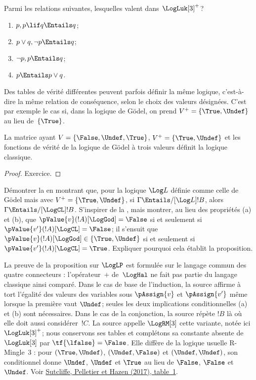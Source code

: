 \documentclass[../../../include/open-logic-section]{subfiles}
\begin{document}
\begin{prob}
  Parmi les relations suivantes,
  lesquelles valent dans~$\LogLuk[3]^{+}$?
  \begin{enumerate}
    \item $p,p\lif q\Entails q$;
    \item $p\lor q,\lnot p\Entails q$;
    \item $\lnot p,p\Entails q$;
    \item $p\Entails p\lor q$.
  \end{enumerate}
\end{prob}

Des tables de vérité différentes
peuvent parfois définir la même
logique, c'est-à-dire la même relation
de conséquence, selon le choix des
valeurs désignées. C'est par exemple
le cas si, dans la logique de G\"odel,
on prend
$V^+=\{\True,\Undef\}$
au lieu de~$\{\True\}$.

\begin{prop}
  La matrice ayant
  $V=\{\False,\Undef,\True\}$,
  $V^+=\{\True,\Undef\}$ et les
  fonctions de vérité de la logique
  de G\"odel à trois valeurs définit
  la logique classique.
\end{prop}

\begin{proof}
  Exercice.
\end{proof}

\begin{prob}
  Démontrer la 
  en montrant que, pour la logique
  $\Log L$ définie comme celle de
  G\"odel mais avec
  $V^+=\{\True,\Undef\}$, si
  $\Gamma\Entails/[\Log L] !B$,
  alors
  $\Gamma\Entails/[\LogCL] !B$.
  S'inspirer de la
  ,
  mais montrer, au lieu des propriétés
  (a) et (b), que
  $\pValue{v}(!A)[\LogGod]=\False$
  si et seulement si
  $\pValue{v'}(!A)[\LogCL]=\False$;
  il s'ensuit que
  $\pValue{v}(!A)[\LogGod]
  \in\{\True,\Undef\}$ si et
  seulement si
  $\pValue{v'}(!A)[\LogCL]=\True$.
  Expliquer pourquoi cela établit
  la proposition.
\end{prob}

\begin{editorial}
La preuve de la proposition sur
$\LogLP$ est formulée sur le langage
commun des quatre connecteurs :
l'opérateur~$+$ de~$\LogHal$ ne
fait pas partie du langage classique
ainsi comparé. Dans le cas de base
de l'induction, la source affirme
à tort l'égalité des valeurs des
variables sous $\pAssign{v}$ et
$\pAssign{v'}$ même lorsque la
première vaut $\Undef$; seules les
deux implications conditionnelles
(a) et (b) sont nécessaires.
Dans le cas de la conjonction,
la source répète $!B$ là où elle
doit aussi considérer~$!C$.
La source appelle $\LogRM[3]$ cette variante,
notée ici $\LogLuk[3]^{+}$; nous conservons ses tables
et complétons sa constante absente de $\LogLuk[3]$ par $\tf{\lfalse}=\False$.
Elle diffère de la logique usuelle R-Mingle~3 :
pour $(\True,\Undef)$, $(\Undef,\False)$ et $(\Undef,\Undef)$,
son conditionnel donne $\Undef$, $\Undef$ et $\True$ au lieu de $\False$, $\False$ et $\Undef$.
Voir \href{https://cdn.aaai.org/ocs/15415/15415-68643-1-PB.pdf}{Sutcliffe, Pelletier et Hazen (2017), table~1}.
\end{editorial}
\end{document}
